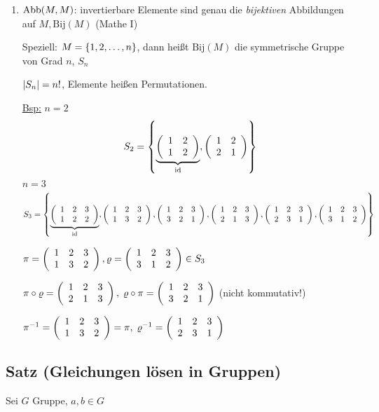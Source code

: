 \begin{enumerate}
	\item
	$\Abb(M, M)$: invertierbare Elemente sind genau die \emph{bijektiven} Abbildungen auf $M, \mathrm{Bij}(M)$ (Mathe I)
	
	Speziell: $M = \aset{1, 2, \dots, n}$, dann heißt $\mathrm{Bij}(M)$ die symmetrische Gruppe von Grad $n$, $S_n$
	
	$\abs{S_n} = n!$, Elemente heißen Permutationen.
	
	\underline{Bsp:} $n=2$
	\[S_2= \aset{
	\underbrace{\aMatrix{cc}{
	1 & 2 \\ 
	1 & 2}}_{\id},
	\aMatrix{cc}{
	1 & 2 \\
	2 & 1}}\]
	$n=3$
	\[S_3 = \aset{
	\underbrace{\sPer{1}{2}{2}}_{\id},
	\sPer{1}{3}{2},
	\sPer{3}{2}{1},
	\sPer{2}{1}{3},
	\sPer{2}{3}{1},
	\sPer{3}{1}{2}
	}\]
	
	$\pi = \sPer{1}{3}{2}, \varrho = \sPer{3}{1}{2} \in S_3$
	
	$\pi \circ \varrho = \sPer{2}{1}{3},\; \varrho \circ \pi = \sPer{3}{2}{1}$ (nicht kommutativ!)
	
	$\pi^{-1} = \sPer{1}{3}{2} = \pi,\; \varrho^{-1}= \sPer{2}{3}{1}$
\end{enumerate}

\subsection[Satz: Gleichungen lösen in Gruppen]{Satz (Gleichungen lösen in Gruppen)}

	Sei $G$ Gruppe, $a, b \in G$
	
